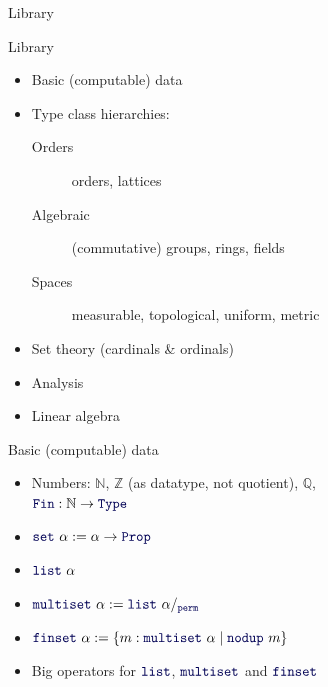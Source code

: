 \documentclass{beamer}
\newcommand{\ident}[1]{{\color{blue!33!black}\ensuremath{\mathtt{#1}}}}
\newcommand{\sect}[1]{\begin{frame}
\begin{center} \Huge{\usebeamercolor[fg]{structure} #1} \end{center}
\end{frame}
}
\begin{document}
\sect{Library}

\begin{frame}{Library}
  \begin{itemize}
    \item Basic (computable) data
    \item Type class hierarchies:
    \begin{description}
      \item[Orders] orders, lattices
      \item[Algebraic] (commutative) groups, rings, fields
      \item[Spaces] measurable, topological, uniform, metric
    \end{description}
    \item Set theory (cardinals \& ordinals)
    \item Analysis
    \item Linear algebra
  \end{itemize}
\end{frame}

\begin{frame}{Basic (computable) data}
  \begin{itemize}[<+->]
    \item Numbers: $\mathbb{N}$, $\mathbb{Z}$ (as datatype, not quotient), $\mathbb{Q}$, \\
        $\ident{Fin} : \mathbb{N} \to \ident{Type}$
    \item $\ident{set}~\alpha := \alpha \to \ident{Prop}$
    \item $\ident{list}~\alpha$
    \item $\ident{multiset}~\alpha := \ident{list}~\alpha /_{\ident{perm}}$
    \item $\ident{finset}~\alpha := \{ m : \ident{multiset}~\alpha \mid \ident{nodup}~m \}$
    \item Big operators for $\ident{list}$, $\ident{multiset}$ and $\ident{finset}$
  \end{itemize}
\end{frame}
\end{document}

